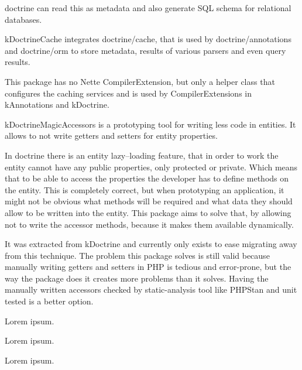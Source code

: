 \gls{doctrine} can read this as metadata and also generate SQL schema for relational databases.

 \label{sec:state:doctrine-cache}

\gls{kDoctrineCache} integrates doctrine/cache, that is used by doctrine/annotations and doctrine/orm to store metadata, results of various parsers and even query results.

This package has no Nette CompilerExtension, but only a helper class that configures the caching services and is used by CompilerExtensions in \gls{kAnnotations} and \gls{kDoctrine}.

 \label{sec:state:doctrine-magic-accessors}

\gls{kDoctrineMagicAccessors} is a prototyping tool for writing less code in entities. It allows to not write getters and setters for entity properties.

In \gls{doctrine} there is an entity lazy--loading feature, that in order to work the entity cannot have any public properties, only protected or private. Which means that to be able to access the properties the developer has to define methods on the entity. This is completely correct, but when prototyping an application, it might not be obvious what methods will be required and what data they should allow to be written into the entity. This package aims to solve that, by allowing not to write the accessor methods, because it makes them available dynamically.

It was extracted from \gls{kDoctrine} and currently only exists to ease migrating away from this technique. The problem this package solves is still valid because manually writing getters and setters in PHP is tedious and error-prone, but the way the package does it creates more problems than it solves. Having the manually written accessors checked by static-analysis tool like PHPStan and unit tested is a better option.

 \label{sec:state:doctrine-collections-readonly}

Lorem ipsum.

 \label{sec:state:doctrine-collections-lazy}

Lorem ipsum.

 \label{sec:state:doctrine-dbal-batch-import}

Lorem ipsum.

